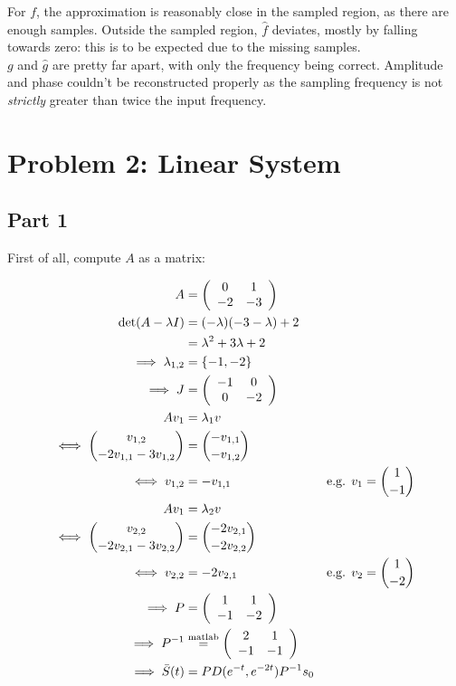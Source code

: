 \documentclass[a4paper,parskip,headheight=38pt]{scrartcl} %
\begin{document}
For $f$, the approximation is reasonably close in the sampled region,
as there are enough samples.  Outside the sampled region, $\hat{f}$
deviates, mostly by falling towards zero: this is to be expected due to
the missing samples.
 \\ %
$g$ and $\hat{g}$ are pretty far apart, with only the frequency being
correct.  Amplitude and phase couldn't be reconstructed properly as the
sampling frequency is not \emph{strictly} greater than twice the input
frequency.


\section*{Problem 2: Linear System}

\subsection*{Part 1}

First of all, compute $A$ as a matrix:

\begin{align*}
    A &= \left( \begin{array}{cc} 0 & 1 \\ -2 & -3 \end{array} \right) \\
    \det(A - \lambda I) &= (-\lambda)(-3-\lambda) + 2 \\
    &= \lambda^2 + 3\lambda + 2 \\
    \implies \lambda_{1,2} &= \{-1, -2\} \\
    \implies J &= \left( \begin{array}{cc} -1 & 0 \\ 0 & -2 \end{array} \right) \\
    Av_1 &= \lambda_1 v \\
    \iff \binom{v_{1,2}}{-2v_{1,1}-3v_{1,2}} &= \binom{-v_{1,1}}{-v_{1,2}} \\
    \iff v_{1,2} &= -v_{1,1} & \text{e.g. } v_1 = \binom{1}{-1} \\
    Av_1 &= \lambda_2 v \\
    \iff \binom{v_{2,2}}{-2v_{2,1}-3v_{2,2}} &= \binom{-2v_{2,1}}{-2v_{2,2}} \\
    \iff v_{2,2} &= -2 v_{2,1} & \text{e.g. } v_2 = \binom{1}{-2} \\
    \implies P &= \left( \begin{array}{cc} 1 & 1 \\ -1 & -2 \end{array} \right) \\
    \implies P^{-1} &\overset{\text{\scriptsize{matlab}}}{=} \left( \begin{array}{cc} 2 & 1 \\ -1 & -1 \end{array} \right) \\
    \implies \bar{S}(t) &= P D(e^{-t}, e^{-2t}) P^{-1} s_0
\end{align*}
\end{document}
